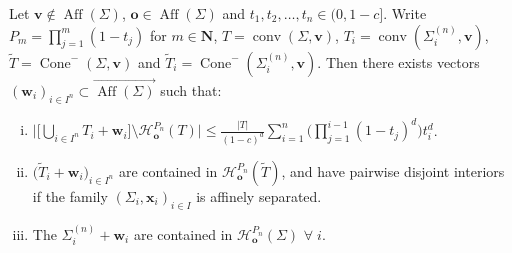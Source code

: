 \documentclass[10pt,a4paper]{amsart}
\newcommand{\N}{\mathbf{N}}
\newcommand{\ocone}[2]{\operatorname{Cone}^-(#1,#2)}
\begin{document}
\begin{proposition}\label{prop: perron tree}

Let $\mathbf{v}\notin \operatorname{Aff}(\Sigma)$, $\mathbf{o}\in \operatorname{Aff}(\Sigma)$ and $t_1, t_2,\dots,t_n\in (0,1-c]$. Write  $P_m=\prod_{j=1}^{m}(1-t_j)$ for $m\in \N$, $T=\operatorname{conv}(\Sigma, \mathbf{v})$, $T_i=\operatorname{conv}(\Sigma_i^{(n)}, \mathbf{v})$, $\widetilde{T}=\ocone{\Sigma}{\mathbf{v}}$ and $\widetilde{T}_i=\ocone{\Sigma_i^{(n)}}{\mathbf{v}}$. Then there exists vectors $(\mathbf{w}_i)_{i\in I^n}\subset \overrightarrow{\operatorname{Aff}(\Sigma)}$ such that:
\begin{enumerate}[(i)]
    \item $\displaystyle \bigg|\bigg[\bigcup_{i\in I^n} T_i+\mathbf{w}_i\bigg]\setminus\mathcal{H}_\mathbf{o}^{P_n}(T)\bigg|\leq \frac{|T|}{(1-c)^d}\sum_{i=1}^n\bigg(\prod_{j=1}^{i-1}(1-t_j)^d\bigg)t_{i}^d$.
    \item $\displaystyle \big(\widetilde{T}_i+\mathbf{w}_i\big)_{i\in I^n}$ are contained in $\mathcal{H}_\mathbf{o}^{P_n}(\widetilde{T})$, and have pairwise disjoint interiors if the family $(\Sigma_i,\mathbf{x}_i)_{i \in I}$ is affinely separated.
\item The $\Sigma_i^{(n)}+
    \mathbf{w}_i$ are contained in $\mathcal{H}_\mathbf{o}^{P_n}(\Sigma)$ $\forall\;i$.
\end{enumerate}
\end{proposition}
\end{document}
